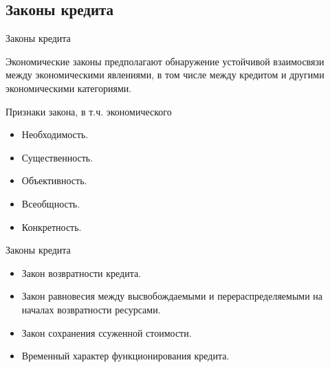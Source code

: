 \documentclass[_DKB_p2_Credit.tex]{subfiles}
\begin{document}
\subsection{Законы кредита}
\begin{frame}{Законы кредита}
\begin{block}{Экономические законы }
предполагают обнаружение устойчивой взаимосвязи между экономическими явлениями, в том числе между кредитом и другими экономическими категориями.
\end{block}
\end{frame}
\begin{frame}{Признаки закона, в т.ч. экономического}
\begin{itemize}[<+->]
\item
Необходимость.
\item
Существенность. 
\item
Объективность.
\item
Всеобщность.
\item
Конкретность.
\end{itemize}
\end{frame}
\begin{frame}{Законы кредита}
\begin{itemize}[<+->]
\item
Закон возвратности кредита.
\item
Закон равновесия между высвобождаемыми и перераспределяемыми на началах возвратности ресурсами.
\item
Закон сохранения ссуженной стоимости. 
\item
Временный характер функционирования кредита. 
\end{itemize}
\end{frame}
\end{document}
